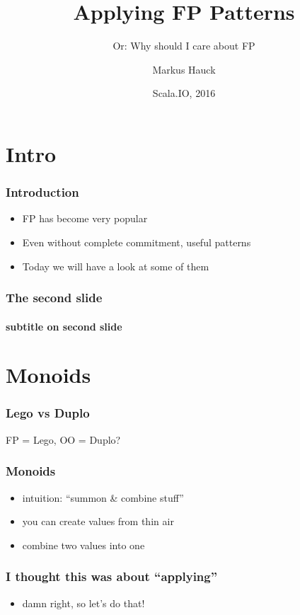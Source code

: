 \documentclass{beamer}
\title{Applying FP Patterns}
\subtitle{Or: Why should I care about FP}
\author{Markus Hauck}
\date{Scala.IO, 2016}
\begin{document}
\frame{\titlepage}

\section{Intro}
\label{sec:intro}

\begin{frame}
  \frametitle{Introduction}
  \begin{itemize}
  \item FP has become very popular
  \item Even without complete commitment, useful patterns
  \item Today we will have a look at some of them
  \end{itemize}
\end{frame}
\begin{frame}
  \frametitle{The second slide}
  \framesubtitle{subtitle on second slide}
\end{frame}

\section{Monoids}
\label{sec:monoids}

\begin{frame}
  \frametitle{Lego vs Duplo}
  FP = Lego, OO = Duplo?
\end{frame}

\begin{frame}
  \frametitle{Monoids}
  \begin{itemize}
  \item intuition: ``summon \& combine stuff''
  \item you can create values from thin air
  \item combine two values into one
  \end{itemize}
\end{frame}

\begin{frame}
  \frametitle{I thought this was about ``applying''}
  \begin{itemize}
  \item damn right, so let's do that!
  \end{itemize}
\end{frame}
\end{document}
